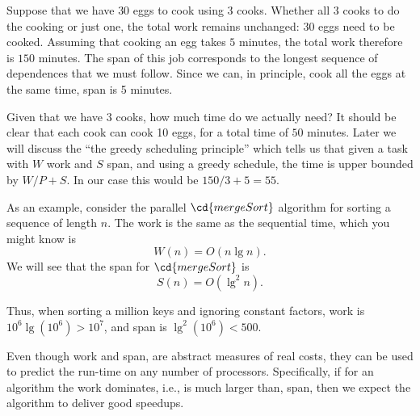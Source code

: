 \begin{flex}
\begin{note}
\end{note}

\begin{example}
\label{xmpl:introduction::parallelism::suppose}
Suppose that we have $30$ eggs to cook using $3$ cooks.  Whether all
$3$ cooks to do the cooking or just one, the total work remains
unchanged: $30$ eggs need to be cooked.
Assuming that cooking an egg takes $5$ minutes, the total work
therefore is $150$ minutes.
The span of this job corresponds to the longest sequence of
dependences that we must follow.
Since we can, in principle, cook all the eggs at the same time, 
span is 5 minutes.

Given that we have $3$ cooks, how much time do we actually need?
It should be clear that each cook can cook 10 eggs, for a total time of $50$
minutes.   Later we will discuss the ``the greedy scheduling
principle'' which tells us that given a task with $W$ work and $S$
span, and using a greedy schedule, the time is upper bounded by $W/P+
S$.    In our case this would be $150/3 + 5 = 55$.

\end{example}
\end{flex}

\begin{cluster}
\label{grp:ex:intro::intro::mergesort-cost}

\begin{example}
\label{ex:intro::intro::mergesort-cost}
As an example, consider the parallel $\cd{mergeSort}$ algorithm for
sorting a sequence of length $n$.  The work is the same as the
sequential time, which you might know is
\[
W(n) = O(n \lg{n}).
\] 
We will see that the span for
$\cd{mergeSort}$ is
\[
S(n) = O(\lg^2{n}).
\]

Thus, when  sorting a million keys and ignoring constant factors, 
work is $10^6\lg (10^6) > 10^7$, and 
span is 
$\lg^2(10^6) < 500.$

\end{example}
\end{cluster}

\begin{cluster}
\label{grp:grm:introduction::parallelism::parallel-time}

\begin{gram}
\label{grm:introduction::parallelism::parallel-time}
Even though work and span, are abstract measures of real costs, they
can be used to predict the run-time on any number of processors.
Specifically, if for an algorithm the work dominates, i.e., is much
larger than, span, then we expect the algorithm to deliver good
speedups.

\end{gram}
\end{cluster}

